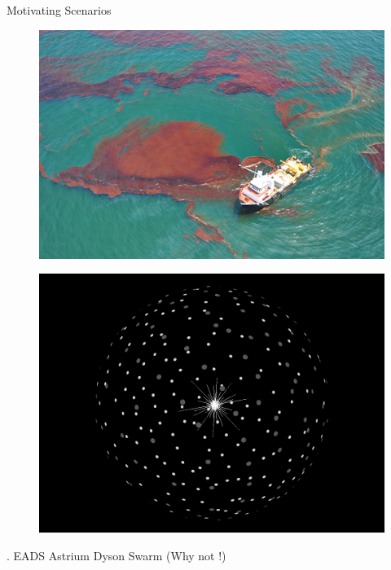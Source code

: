 \begin{frame}{Motivating Scenarios}
\begin{minipage}{0.45\textwidth}
\begin{figure}
		\end{figure}
	\end{minipage}
	\hspace{0.05cm}
	\begin{minipage}{0.45\textwidth}
		\begin{figure}
			\includegraphics[width=\textwidth]{figures/oil_spill.jpg}
		\end{figure}
		\begin{figure}
			\includegraphics[scale=0.1]{figures/Dyson_swarm.png}		
			\label{fig:Dyson_swarms}
		\end{figure}	
	\end{minipage}
 
 .
 \hspace{0.5 cm}
  EADS Astrium 
\hspace{1.7 cm}
Dyson Swarm (Why not !)
\\
\end{frame}
